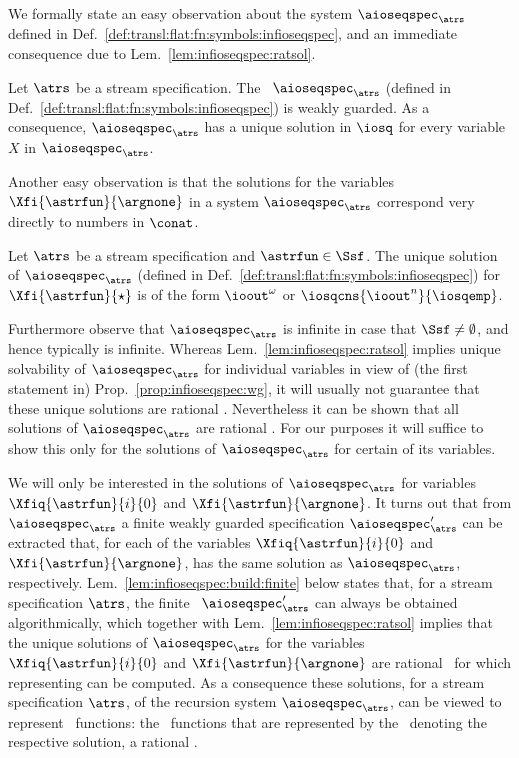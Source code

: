 We formally state an easy observation about the system $\aioseqspec_{\atrs}$
defined in Def.~\ref{def:transl:flat:fn:symbols:infioseqspec},
and an immediate consequence due to Lem.~\ref{lem:infioseqspec:ratsol}.


\begin{proposition}\label{prop:infioseqspec:wg}
Let $\atrs$ be a stream specification. 
  The \infioseqspec~$\aioseqspec_{\atrs}$ (defined in
  Def.~\ref{def:transl:flat:fn:symbols:infioseqspec}) is weakly guarded.
  As a consequence, 
  $\aioseqspec_{\atrs}$ has a unique solution in $\iosq$
  for every variable $X$ in $\aioseqspec_{\atrs}$.
\end{proposition}


Another easy observation is that the solutions for the 
variables $\Xfi{\astrfun}{\argnone}$ in a system $\aioseqspec_{\atrs}$
correspond very directly to numbers in $\conat$.


\begin{proposition}\label{prop:infioseqspec:argnone}
Let $\atrs$ be a stream specification and $\astrfun\in\Ssf$.
  The unique solution of $\aioseqspec_{\atrs}$ (defined in
  Def.~\ref{def:transl:flat:fn:symbols:infioseqspec})
  for $\Xfi{\astrfun}{\star}$ is of the form
  $\ioout^{\omega}$ or $\iosqcns{\ioout^n}{\iosqemp}$.
\end{proposition}

Furthermore observe that $\aioseqspec_{\atrs}$ is infinite in case that
$\Ssf\neq\emptyset$, and hence typically is infinite.
Whereas Lem.~\ref{lem:infioseqspec:ratsol} implies unique solvability
of $\aioseqspec_{\atrs}$ for individual variables
in view of (the first statement in) Prop.~\ref{prop:infioseqspec:wg}, 
it will usually not
guarantee that these unique solutions are rational .
Nevertheless it can be shown that all solutions
of $\aioseqspec_{\atrs}$ are rational .
For our purposes it will suffice to show this only for the solutions 
of $\aioseqspec_{\atrs}$ for certain of its variables.

We will only be interested in the solutions of $\aioseqspec_{\atrs}$
for variables $\Xfiq{\astrfun}{i}{0}$ and $\Xfi{\astrfun}{\argnone}$.
It turns out that from $\aioseqspec_{\atrs}$
a finite weakly guarded specification $\aioseqspec'_{\atrs}$ can be extracted
that, 
for each of the variables $\Xfiq{\astrfun}{i}{0}$ and $\Xfi{\astrfun}{\argnone}$,
has the same solution as $\aioseqspec_{\atrs}$, respectively.
Lem.~\ref{lem:infioseqspec:build:finite} below states that,
for a stream specification $\atrs$, the finite 
\infioseqspec~$\aioseqspec'_{\atrs}$ can always be obtained algorithmically,
which together with Lem.~\ref{lem:infioseqspec:ratsol} implies that
the unique solutions of $\aioseqspec_{\atrs}$ for the
variables $\Xfiq{\astrfun}{i}{0}$ and $\Xfi{\astrfun}{\argnone}$
are rational \
for which representing  can be computed. 
As a consequence these solutions, for a stream specification $\atrs$,
of the recursion system $\aioseqspec_{\atrs}$, can be viewed to represent \pein~functions: 
the \pein~functions that are represented by the \ioterm\
denoting the respective solution, a rational \ioseq. 



